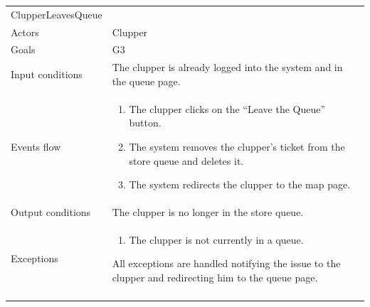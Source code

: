 \clearpage
\begin{longtable}[]{@{}
  >{\raggedright\arraybackslash}p{}
  >{\raggedright\arraybackslash}p{}@{}}
\toprule
ClupperLeavesQueue & \\ \addlinespace
\midrule
\endhead
Actors & Clupper \\ \addlinespace
Goals & G3 \\ \addlinespace
Input conditions & The clupper is already logged into the system and in the queue page. \\ \addlinespace
Events flow & \begin{enumerate}\vspace{-1.35\baselineskip}
    \item The clupper clicks on the ``Leave the Queue'' button.
    \item The system removes the clupper's ticket from the store queue and deletes it.
    \item The system redirects the clupper to the map page. 
\vspace{-1.0\baselineskip}\end{enumerate} \\ \addlinespace
Output conditions & The clupper is no longer in the store queue. \\ \addlinespace
Exceptions & \begin{enumerate}\vspace{-1.35\baselineskip}
    \item The clupper is not currently in a queue.
\end{enumerate} All exceptions are handled notifying the issue to the clupper and redirecting him to the queue page. \\ \addlinespace
\bottomrule
\end{longtable}

